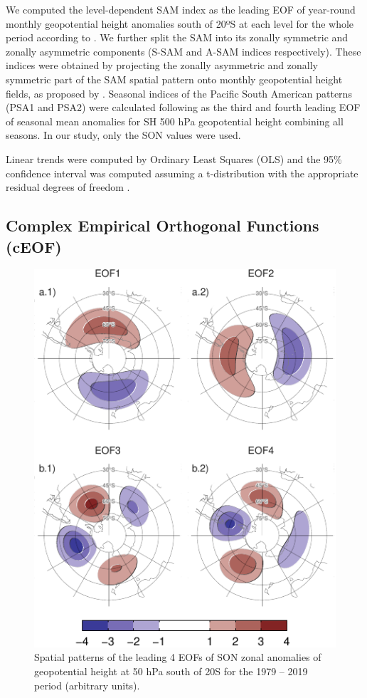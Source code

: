 \documentclass[smallextended]{svjour3}       %
\begin{document}
We computed the level-dependent SAM index as the leading EOF of year-round monthly geopotential height anomalies south of 20ºS at each level for the whole period according to \citet{baldwin2009}.
We further split the SAM into its zonally symmetric and zonally asymmetric components (S-SAM and A-SAM indices respectively).
These indices were obtained by projecting the zonally asymmetric and zonally symmetric part of the SAM spatial pattern onto monthly geopotential height fields, as proposed by \citet{campitelli2021}.
Seasonal indices of the Pacific South American patterns (PSA1 and PSA2) were calculated following \citet{mo2001} as the third and fourth leading EOF of seasonal mean anomalies for SH 500 hPa geopotential height combining all seasons.
In our study, only the SON values were used.

Linear trends were computed by Ordinary Least Squares (OLS) and the 95\% confidence interval was computed assuming a t-distribution with the appropriate residual degrees of freedom \citep{wilks2011r}.

\hypertarget{complex-empirical-orthogonal-functions-ceof}{%
\subsection{Complex Empirical Orthogonal Functions (cEOF)}\label{complex-empirical-orthogonal-functions-ceof}}



\begin{figure}
\centering
\includegraphics{../figures/eof-naive-1.pdf}
\caption{\label{fig:eof-naive}Spatial patterns of the leading 4 EOFs of SON zonal anomalies of geopotential height at 50 hPa south of 20\degree S for the 1979 -- 2019 period (arbitrary units).}
\end{figure}
\end{document}
